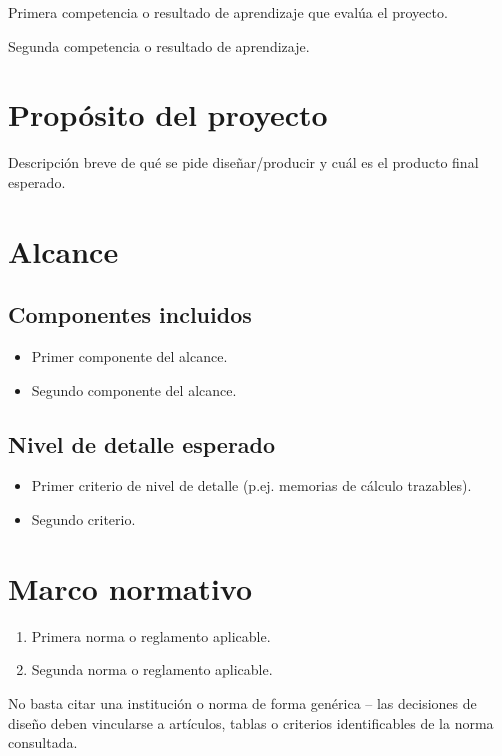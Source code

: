 \documentclass[11pt]{scrartcl}
\begin{document}
\icvmaketitle

\begin{icvobjectives}
  \item Primera competencia o resultado de aprendizaje que evalúa el proyecto.
  \item Segunda competencia o resultado de aprendizaje.
\end{icvobjectives}

\section{Propósito del proyecto}

Descripción breve de qué se pide diseñar/producir y cuál es el producto
final esperado.

\section{Alcance}

\subsection{Componentes incluidos}
\begin{itemize}
  \item Primer componente del alcance.
  \item Segundo componente del alcance.
\end{itemize}

\subsection{Nivel de detalle esperado}
\begin{itemize}
  \item Primer criterio de nivel de detalle (p.ej. memorias de cálculo trazables).
  \item Segundo criterio.
\end{itemize}

\section{Marco normativo}
\begin{enumerate}
  \item Primera norma o reglamento aplicable.
  \item Segunda norma o reglamento aplicable.
\end{enumerate}

\begin{icvwarning}[Atención]
No basta citar una institución o norma de forma genérica -- las
decisiones de diseño deben vincularse a artículos, tablas o criterios
identificables de la norma consultada.
\end{icvwarning}
\end{document}
